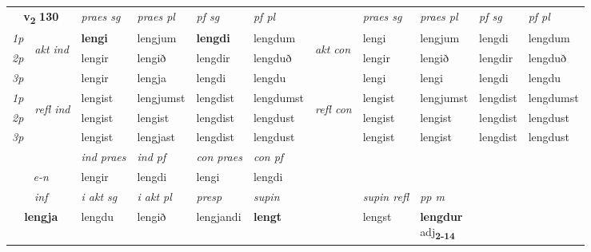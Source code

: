 \noindent
\begin{tabular}{lllllllllll} \toprule
\multicolumn{2}{c}{\textbf{v{\textsubscript{2}}} \Large{\textbf{130}}}  &  \textit{praes sg}  & \textit{praes pl}  &\textit{ pf sg} & \textit{pf pl} &  &  \textit{praes sg}  & \textit{praes pl}  & \textit{pf sg} & \textit{pf pl } \\*
	\cmidrule{3-6} \cmidrule{8-11}
 {\textit{1p}} & \multirow{3}{*}{\begin{turn}{90}\textit{akt ind}\end{turn}} & \textbf{lengi} & lengjum & \textbf{lengdi} & lengdum & \multirow{3}{*}{\begin{turn}{90}\textit{akt con}\end{turn}} &lengi & lengjum & lengdi & lengdum\\*
 {\textit{2p}} &  &  lengir  & lengið & lengdir & lengduð & & lengir & lengið & lengdir & lengduð \\*
{\textit{3p}} &  & lengir & lengja & lengdi & lengdu & & lengi & lengi& lengdi & lengdu \\*
\cmidrule{3-6} \cmidrule{8-11}
 {\textit{1p}} & \multirow{3}{*}{\begin{turn}{90}\textit{refl ind}\end{turn}}  & lengist & lengjumst & lengdist & lengdumst & \multirow{3}{*}{\begin{turn}{90}\textit{refl con}\end{turn}}  &lengist & lengjumst & lengdist & lengdumst \\*
 {\textit{2p}} &  & lengist & lengist & lengdist & lengdust & &lengist & lengist & lengdist & lengdust \\*
 {\textit{3p}}  & & lengist & lengjast & lengdist & lengdust & & lengist & lengist& lengdist & lengdust \\*
\cmidrule{3-6} \cmidrule{8-11}

   & &  \textit{ind praes} & \textit{ind pf} & \textit{con praes} & \textit{con pf} \\*
\multicolumn{2}{c}{ \textit{e-n} } & lengir & lengdi & lengi & lengdi \\*

\cmidrule{3-9}
   \multicolumn{2}{c}{\textit{inf}}  & \textit{i akt sg} & \textit{i akt pl}   & \textit{presp} & \textit{supin} && \textit{supin refl} & \textit{pp m} \\*
  \multicolumn{2}{c}{\textbf{lengja}} & lengdu  & lengið   & lengjandi &  \textbf{lengt} && lengst & \specialcell{\textbf{lengdur} \\ adj\textbf{\textsubscript{2-14}}} \\*
\end{tabular}

